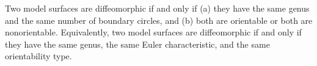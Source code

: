 Two model surfaces are diffeomorphic if and only if (a) they have the same genus and the same number of boundary circles, and (b) both are orientable or both are nonorientable. Equivalently, two model surfaces are diffeomorphic if and only if they have the same genus, the same Euler characteristic, and the same orientability type.
